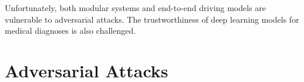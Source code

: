 







Unfortunately, both modular systems and end-to-end driving models are vulnerable to adversarial attacks. The trustworthiness of deep learning models for medical diagnoses is also challenged.


\section{Adversarial Attacks}
\label{sec:adv_attack}

